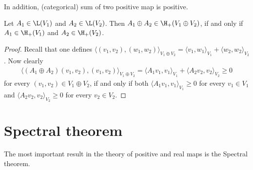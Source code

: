 In addition, (categorical) sum of two positive map is positive.
\begin{lem}
	Let $A_{1} \in \L(V_{1})$ and $A_{2} \in \L(V_{2})$. Then $A_{1} \oplus A_{2} \in \H_{+}(V_{1} \oplus V_{2})$, if and only if $A_{1} \in \H_{+}(V_{1})$ and $A_{2} \in \H_{+}(V_{2})$.
\end{lem}
\begin{proof}
	Recall that one defines $\langle(v_{1}, v_{2}), (w_{1}, w_{2}) \rangle_{V_{1} \oplus V_{2}} = \langle v_{1}, w_{1} \rangle_{V_{1}} + \langle w_{2}, w_{2} \rangle_{V_{2}}$. Now clearly
	\begin{align*}
	\langle (A_{1} \oplus A_{2})(v_{1}, v_{2}), (v_{1}, v_{2}) \rangle_{V_{1} \oplus V_{2}} =  \langle A_{1} v_{1}, v_{1} \rangle_{V_{1}} + \langle A_{2} v_{2}, v_{2} \rangle_{V_{2}} \geq 0
	\end{align*}
	for every $(v_{1}, v_{2}) \in V_{1} \oplus V_{2}$, if and only if both $\langle A_{1} v_{1}, v_{1} \rangle_{V_{1}} \geq 0$ for every $v_{1} \in V_{1}$ and $\langle A_{2} v_{2}, v_{2} \rangle_{V_{2}} \geq 0$ for every $v_{2} \in V_{2}$.
\end{proof}

\section{Spectral theorem}

The most important result in the theory of positive and real maps is the Spectral theorem.

